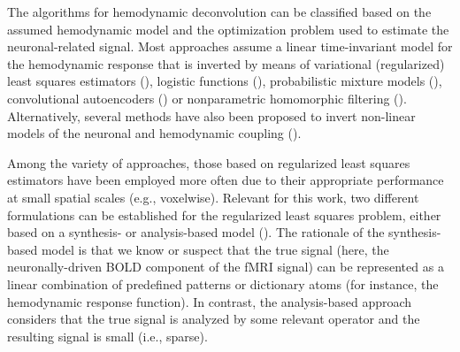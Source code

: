 The algorithms for hemodynamic deconvolution can be classified based on the assumed hemodynamic model and the optimization problem used to estimate the neuronal-related signal. Most approaches assume a linear time-invariant model for the hemodynamic response that is inverted by means of variational (regularized) least squares estimators (\citealt{Glover1999DeconvolutionImpulseResponse,Gitelman2003Modelingregionalpsychophysiologic,Gaudes2010Detectioncharacterizationsingle,Gaudes2012Structuredsparsedeconvolution,Gaudes2013Paradigmfreemapping,CaballeroGaudes2019deconvolutionalgorithmmulti,HernandezGarcia2011Neuronaleventdetection,Karahanoglu2013TotalactivationfMRI,Cherkaoui2019SparsitybasedBlind,Costantini2021ParadigmFreeRegularization,Huetel2021Hemodynamicmatrixfactorization}), logistic functions (\citealt{Bush2013Decodingneuralevents,Bush2015deconvolutionbasedapproach,Loula2018DecodingfMRIactivity}), probabilistic mixture models (\citealt{Pidnebesna2019EstimatingSparseNeuronal}), convolutional autoencoders (\citealt{Huetel2018NeuralActivationEstimation}) or nonparametric homomorphic filtering (\citealt{Sreenivasan2015NonparametricHemodynamicDeconvolution}). Alternatively, several methods have also been proposed to invert non-linear models of the neuronal and hemodynamic coupling (\citealt{Riera2004statespacemodel,Friston2008DEMvariationaltreatment,Havlicek2011Dynamicmodelingneuronal,Aslan2016Jointstateparameter,Madi2017HybridCubatureKalman,ruizeuler2018nonlinear}). 

Among the variety of approaches, those based on regularized least squares estimators have been employed more often due to their appropriate performance at small spatial scales (e.g., voxelwise). Relevant for this work, two different formulations can be established for the regularized least squares problem, either based on a synthesis- or analysis-based model (\citealt{Elad2007Analysisversussynthesis,ortelli2019synthesis}). The rationale of the synthesis-based model is that we know or suspect that the true signal (here, the neuronally-driven BOLD component of the fMRI signal) can be represented as a linear combination of predefined patterns or dictionary atoms (for instance, the hemodynamic response function). In contrast, the analysis-based approach considers that the true signal is analyzed by some relevant operator and the resulting signal is small (i.e., sparse).

